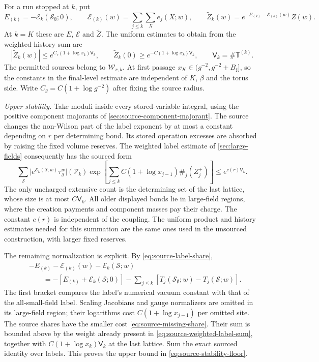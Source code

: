 \documentclass[11pt,letterpaper,reqno]{amsart}
\theoremstyle{definition}
\theoremstyle{remark}
\begin{document}
For a run stopped at $k$, put
\[
 E_{(k)}=-\mathcal E_k(\mathcal S_\emptyset;0),\qquad
 \mathcal E_{(k)}(w)=\sum_{j\le k}\sum_Xe_j(X;w),\qquad
 \widetilde Z_k(w)=e^{-E_{(k)}-\mathcal E_{(k)}(w)}Z(w).
\]
At $k=K$ these are $E$, $\mathcal E$ and $\widetilde Z$.
The uniform estimates to obtain from the weighted history sum are
\begin{equation}\label{eq:source-stability-floor}
 |\widetilde Z_k(w)|\le e^{C_r(1+\log x_k)\mathsf V_k},\qquad
 \widetilde Z_k(0)\ge e^{-C(1+\log x_k)\mathsf V_k},\qquad
 \mathsf V_k=\#\mathbb T^{(k)}.
\end{equation}
The permitted sources belong to $\mathcal W_{r,k}$. At first
passage $x_K\in(g^{-2},g^{-2}+B_\sharp]$, so the constants in
the final-level estimate are independent of $K$, $\beta$ and
the torus side. Write $C_g=C(1+\log g^{-2})$ after fixing the
source radius.

\emph{Upper stability.}
Take moduli inside every stored-variable integral, using the
positive component majorants of
\cref{sec:source-component-majorant}. The source changes the
non-Wilson part of the label exponent by at most a constant
depending on $r$ per determining bond. Its stored operation
excesses are absorbed by raising the fixed volume reserves.
The weighted label estimate of \cref{sec:large-fields} consequently
has the sourced form
\begin{equation}\label{eq:source-weighted-label-sum}
 \sum_{\mathcal S}
 \big|e^{\mathcal E_k(\mathcal S;w)}\tau^w_{\mathcal S}\big|
                                            (\mathcal V_k)
 \exp\!\left[\sum_{j\le k}
       C(1+\log x_{j-1})\#_j(Z_j^+)\right]
                            \le e^{c(r)\mathsf V_k}.
\end{equation}
The only uncharged extensive count is the determining set of the
last lattice, whose size is at most $C\mathsf V_k$. All older displayed
bonds lie in large-field regions, where the creation payments and
component masses pay their charge. The constant $c(r)$ is
independent of the coupling. The uniform product and history
estimates needed for this summation are the same ones used in
the unsourced construction, with larger fixed reserves.

The remaining normalization is explicit. By
\eqref{eq:source-label-share},
\begin{align*}
 &-E_{(k)}-\mathcal E_{(k)}(w)-\mathcal E_k(\mathcal S;w)\\
 &\qquad=-[E_{(k)}+\mathcal E_k(\mathcal S;0)]
       -\sum_{j\le k}[T_j(\mathcal S_\emptyset;w)
                                      -T_j(\mathcal S;w)].
\end{align*}
The first bracket compares the label's numerical vacuum constant
with that of the all-small-field label. Scaling Jacobians and
gauge normalizers are omitted in its large-field region; their
logarithms cost $C(1+\log x_{j-1})$ per omitted site. The source
shares have the smaller cost \eqref{eq:source-missing-share}.
Their sum is bounded above by the weight already present in
\eqref{eq:source-weighted-label-sum}, together with
$C(1+\log x_k)\mathsf V_k$ at the last lattice. Sum the exact sourced
identity over labels. This proves the upper bound in
\eqref{eq:source-stability-floor}.
\end{document}
